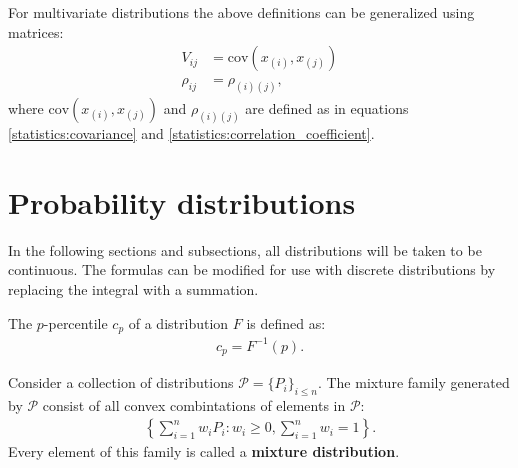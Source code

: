     \begin{remark}
        For multivariate distributions the above definitions can be generalized using matrices:
        \begin{align}
            \label{statistics:covariance_matrix}
            V_{ij} &= \text{cov}(x_{(i)}, x_{(j)})\\
            \label{statistics:correlation_matrix}
            \rho_{ij} &= \rho_{(i)(j)},
        \end{align}
        where $\text{cov}(x_{(i)}, x_{(j)})$ and $\rho_{(i)(j)}$ are defined as in equations \ref{statistics:covariance} and \ref{statistics:correlation_coefficient}.
    \end{remark}

\section{Probability distributions}

    In the following sections and subsections, all distributions will be taken to be continuous. The formulas can be modified for use with discrete distributions by replacing the integral with a summation.

    \begin{definition}[Percentile]
        The $p$-percentile $c_p$ of a distribution $F$ is defined as:
        \begin{gather}
            c_p = F^{-1}(p).
        \end{gather}
    \end{definition}


    \begin{example}
        Consider a collection of distributions $\mathcal{P}=\{P_i\}_{i\leq n}$. The mixture family generated by $\mathcal{P}$ consist of all convex combintations of elements in $\mathcal{P}$:
        \begin{gather}
            \left\{\sum_{i=1}^nw_iP_i:w_i\geq0, \sum_{i=1}^nw_i = 1\right\}.
        \end{gather}
        Every element of this family is called a \textbf{mixture distribution}.
    \end{example}

